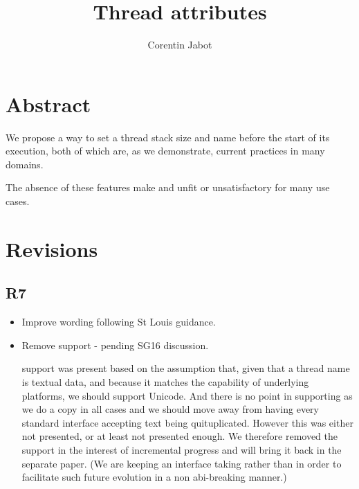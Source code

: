 \documentclass{wg21}
\title{Thread attributes}
\author{Corentin Jabot}{corentin.jabot@gmail.com}
\begin{document}
\maketitle

\setlength{\arrayrulewidth}{0.2mm}
\setlength{\tabcolsep}{8pt}
\renewcommand{\arraystretch}{1.}

\def\changemargin#1#2{\list{}{\rightmargin#2\leftmargin#1}\item[]}
\let\endchangemargin=\endlist
\setlength\extrarowheight{5pt}


\section{Abstract}

We propose a way to set a thread stack size and name before the start of its execution, both of which are,
as we demonstrate, current practices in many domains.

The absence of these features make  and  unfit or unsatisfactory for many use cases.

\section{Revisions}

\subsection{R7}
\begin{itemize}
\item Improve wording following St Louis guidance.
\item Remove  support - pending SG16 discussion.

 support was present based on the assumption that, given that
a thread name is textual data, and because it matches the capability of underlying platforms,
we should support Unicode. And there is no point in supporting  as
we do a copy in all cases and we should move away from having every standard interface accepting text
being quituplicated.
However this was either not presented, or at least not presented enough.
We therefore removed the support in the interest of incremental progress and will bring it back in the separate paper.
(We are keeping an interface taking  rather than  in order to facilitate such future evolution in a non abi-breaking manner.)

\end{itemize}
\end{document}

